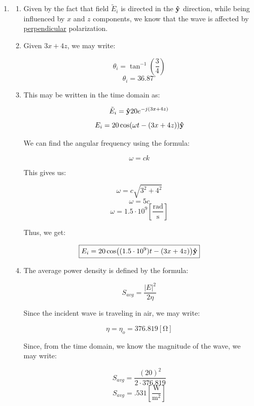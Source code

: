 \begin{enumerate}
\begin{enumerate}
    \end{enumerate}

  \item

    \begin{enumerate}

      \item 

        Given by the fact that field $\tilde{E}_i$ is directed in the $\bold{\hat{y}}$ direction, while being influenced by $x$ and $z$ components, we know that the wave is affected by \underline{perpendicular} polarization.

      \item 

        Given $3x+4z$, we may write:

        $$\theta_i=\tan^{-1}\left( \frac{3}{4} \right)$$
        $$\boxed{\theta_i=36.87^{\circ}}$$

      \item 

        This may be written in the time domain as:

        $$\tilde{E}_i=\bold{\hat{y}}20e^{-j(3x+4z)}$$
        $$E_i=20\cos(\omega t-(3x+4z))\bold{\hat{y}}$$

        We can find the angular frequency using the formula:

        $$\omega=ck$$

        This gives us:

        $$\omega=c\sqrt{3^2+4^2}$$
        $$\omega=5c$$
        $$\omega=1.5\cdot10^{9}\left[ \frac{\text{rad}}{\si{\second}} \right]$$

        Thus, we get:

        $$\boxed{E_i=20\cos((1.5\cdot10^9) t-(3x+4z))\bold{\hat{y}}}$$

      \item 

        The average power density is defined by the formula:

        $$S_{avg}=\frac{|E|^2}{2\eta}$$

        Since the incident wave is traveling in air, we may write:

        $$\eta=\eta_o=376.819[\si{\ohm}]$$

        Since, from the time domain, we know the magnitude of the wave, we may write:

        $$S_{avg}=\frac{(20)^2}{2\cdot376.819}$$
        $$\boxed{S_{avg}=.531\left[ \frac{\si{\watt}}{\si{\meter\squared}} \right]}$$


\end{enumerate}
\end{enumerate}
